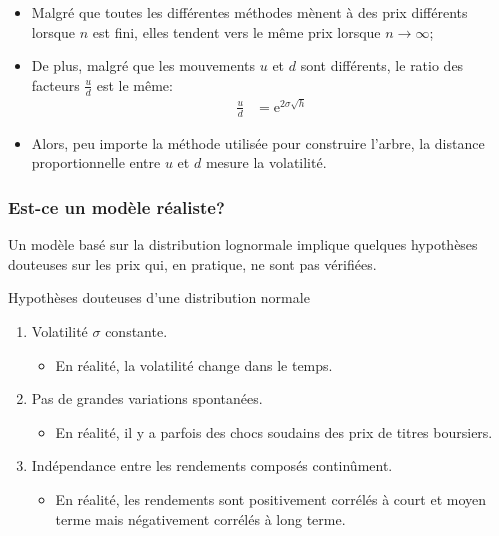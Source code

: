 \documentclass[10pt, french]{article}
\begin{document}
\begin{multicols*}{2}
\begin{itemize}
	\item	Malgré que toutes les différentes méthodes mènent à des prix différents lorsque $n$ est fini, elles tendent vers le même prix lorsque $n \rightarrow \infty$;
	\item	De plus, malgré que les mouvements $u$ et $d$ sont différents, le ratio des facteurs $\frac{u}{d}$ est le même:\\
		\begin{align*}
			\frac{u}{d}
			&=	\textrm{e}^{2\sigma\sqrt{h}}
		\end{align*}
	\item	Alors, peu importe la méthode utilisée pour construire l'arbre, la distance proportionnelle entre $u$ et $d$ mesure la volatilité.
\end{itemize} 

\columnbreak
\subsubsection*{Est-ce un modèle réaliste?}
Un modèle basé sur la distribution lognormale implique quelques hypothèses douteuses sur les prix qui, en pratique, ne sont pas vérifiées.

\begin{conceptgen}{Hypothèses douteuses d'une distribution normale}
\begin{enumerate}[label = \alph*), leftmargin = *]
	\item	Volatilité $\sigma$ constante.
		\begin{itemize}
		\item	En réalité, la volatilité change dans le temps.
		\end{itemize}
	\item	Pas de grandes variations spontanées.
		\begin{itemize}
		\item	En réalité, il y a parfois des chocs soudains des prix de titres boursiers.
		\end{itemize}
	\item	Indépendance entre les rendements composés continûment.
		\begin{itemize}
		\item	En réalité, les rendements sont positivement corrélés à court et moyen terme mais négativement corrélés à long terme.
		\end{itemize}
\end{enumerate}
\end{conceptgen}


\end{multicols*}
\end{document}
